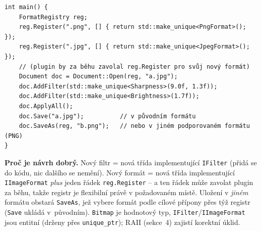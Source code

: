 \documentclass[11pt,a4paper]{article}
\newcommand{\cd}{\lstinline[style=cpp]}
\begin{document}
\begin{priklad}
\begin{lstlisting}[style=cpp]
int main() {
    FormatRegistry reg;
    reg.Register(".png", [] { return std::make_unique<PngFormat>(); });
    reg.Register(".jpg", [] { return std::make_unique<JpegFormat>(); });
    // (plugin by za běhu zavolal reg.Register pro svůj nový formát)
    Document doc = Document::Open(reg, "a.jpg");
    doc.AddFilter(std::make_unique<Sharpness>(9.0f, 1.3f));
    doc.AddFilter(std::make_unique<Brightness>(1.7f));
    doc.ApplyAll();
    doc.Save("a.jpg");          // v původním formátu
    doc.SaveAs(reg, "b.png");   // nebo v jiném podporovaném formátu (PNG)
}
\end{lstlisting}

\textbf{Proč je návrh dobrý.} Nový filtr = nová třída implementující \texttt{IFilter} (přidá se do kódu, nic dalšího se nemění). Nový formát = nová třída implementující \texttt{IImageFormat} \emph{plus} jeden řádek \texttt{reg.Register} -- a ten řádek může zavolat plugin za běhu, takže registr je flexibilní právě v požadovaném místě. Uložení v \emph{jiném} formátu obstará \texttt{SaveAs}, jež vybere formát podle cílové přípony přes týž registr (\texttt{Save} ukládá v~původním). \texttt{Bitmap} je hodnotový typ, \texttt{IFilter}/\texttt{IImageFormat} jsou entitní (drženy přes \cd{unique_ptr}); RAII (sekce~4) zajistí korektní úklid.

\begin{center}
\end{center}
\end{priklad}
\end{document}
